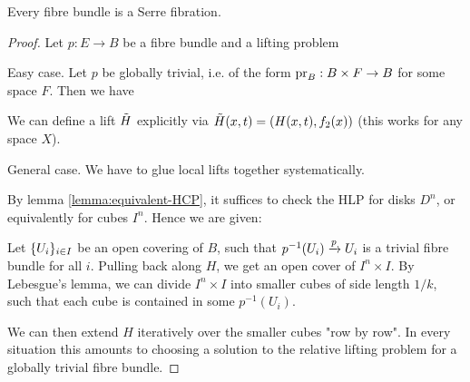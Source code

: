 \begin{theorem}
Every fibre bundle is a Serre fibration.
\end{theorem}

\begin{proof}
Let $p:E\to B$ be a fibre bundle and a lifting problem
\begin{center}
\end{center}

Easy case. Let $p$ be globally trivial, i.e. of the form $\operatorname{pr}_B:B\times F\to B$ for some space $F$. Then we have
\begin{center}
\end{center}
We can define a lift $\tilde H$ explicitly via $\tilde H(x,t)=(H(x,t),f_2(x))$ (this works for any space $X$).

General case. We have to glue local lifts together systematically.

By lemma \ref{lemma:equivalent-HCP}, it suffices to check the HLP for disks $D^n$, or equivalently for cubes $I^n$. Hence we are given:
\begin{center}
\end{center}

Let $\{U_i\}_{i\in I}$ be an open covering of $B$, such that $p^{-1}(U_i)\xrightarrow{p}U_i$ is a trivial fibre bundle for all $i$. Pulling back along $H$, we get an open cover of $I^n\times I$. By Lebesgue's lemma, we can divide $I^n\times I$ into smaller cubes of side length $1/k$, such that each cube is contained in some $p^{-1}(U_i)$.\alvaropls{}

We can then extend $H$ iteratively over the smaller cubes "row by row". In every situation this amounts to choosing a solution to the relative lifting problem for a globally trivial fibre bundle.

\end{proof}

